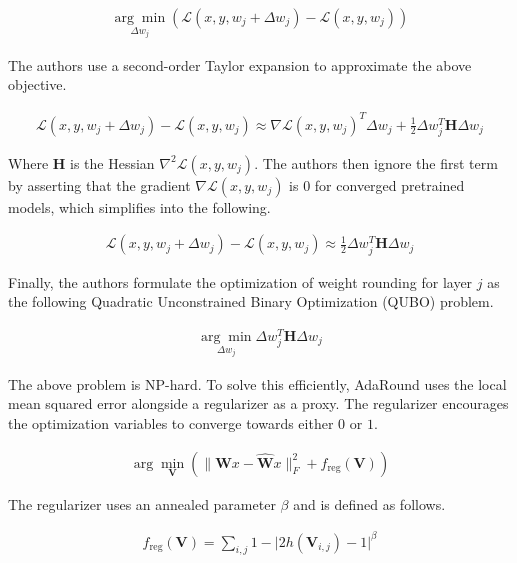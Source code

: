 \documentclass[../main.tex]{subfiles}
\begin{document}
\begin{align}
\underset{\Delta w_j}{\arg\min} \left(\mathcal{L}(x, y, w_j + \Delta w_j) - \mathcal{L}(x, y, w_j)\right)
\end{align}

The authors use a second-order Taylor expansion to approximate the above objective.

\begin{align} \label{eq:adaround_taylor_expansion}
\mathcal{L}(x, y, w_j + \Delta w_j) - \mathcal{L}(x, y, w_j) \approx \nabla\mathcal{L}(x, y, w_j)^T \Delta w_j + \frac{1}{2} \Delta w_j^T \mathbf{H} \Delta w_j
\end{align}

Where $\mathbf{H}$ is the Hessian $\nabla^2\mathcal{L}(x, y, w_j)$. The authors then ignore the first term by asserting that the gradient $\nabla\mathcal{L}(x, y, w_j)$ is $0$ for converged pretrained models, which simplifies into the following.

\begin{align}
\mathcal{L}(x, y, w_j + \Delta w_j) - \mathcal{L}(x, y, w_j) \approx \frac{1}{2} \Delta w_j^T \mathbf{H} \Delta w_j
\end{align}

Finally, the authors formulate the optimization of weight rounding for layer $j$ as the following Quadratic Unconstrained Binary Optimization (QUBO) problem.

\begin{align}
\underset{\Delta w_j}{\arg\min} \Delta w_j^T \mathbf{H} \Delta w_j
\end{align}

The above problem is NP-hard. To solve this efficiently, AdaRound uses the local mean squared error alongside a regularizer as a proxy. The regularizer encourages the optimization variables to converge towards either $0$ or $1$.


\begin{align} \label{eq:adaround_objective}
\arg\min_{\mathbf{V}} \left( \|\mathbf{W}x - \hat{\mathbf{W}}x\|_F^2 + f_\text{reg}(\mathbf{V}) \right)
\end{align}

The regularizer uses an annealed parameter $\beta$ and is defined as follows.

\begin{align}
f_{\text{reg}}(\mathbf{V}) = \sum_{i, j} 1 - \lvert 2h(\mathbf{V}_{i,j}) - 1\rvert^\beta
\end{align}
\end{document}
